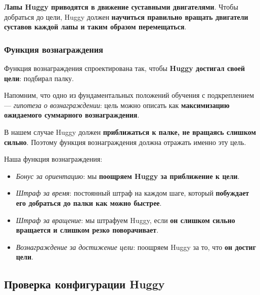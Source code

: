 \documentclass[11pt,a4paper]{article}
\begin{document}

\textbf{Лапы Huggy приводятся в движение суставными двигателями}. Чтобы добраться до цели, Huggy должен \textbf{научиться правильно вращать двигатели суставов каждой лапы и таким образом перемещаться}.

\subsubsection{Функция вознаграждения}\label{the-reward-function-1}

Функция вознаграждения спроектирована так, чтобы \textbf{Huggy достигал своей цели}: подбирал палку.

Напомним, что одно из фундаментальных положений обучения с подкреплением --- \emph{гипотеза о вознаграждении}: цель можно описать как \textbf{максимизацию ожидаемого суммарного вознаграждения}.

В нашем случае Huggy должен \textbf{приближаться к палке, не вращаясь слишком сильно}. Поэтому функция вознаграждения должна отражать именно эту цель.

Наша функция вознаграждения:


\begin{itemize}
\tightlist
\item
  \emph{Бонус за ориентацию}: мы \textbf{поощряем Huggy за приближение к цели}.
\item
  \emph{Штраф за время}: постоянный штраф на каждом шаге, который \textbf{побуждает его добраться до палки как можно быстрее}.
\item
  \emph{Штраф за вращение}: мы штрафуем Huggy, если \textbf{он слишком сильно вращается и слишком резко поворачивает}.
\item
  \emph{Вознаграждение за достижение цели}: поощряем Huggy за то, что \textbf{он достиг цели}.
\end{itemize}

\subsection{Проверка конфигурации Huggy}\label{check-the-huggy-config-file}
\end{document}
